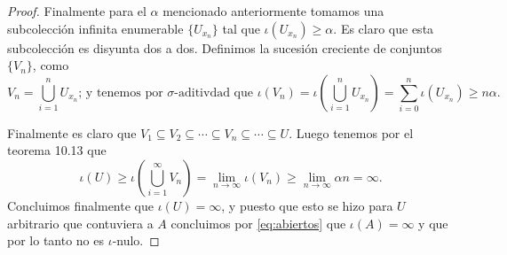 \documentclass[letter,twoside,12pt]{article}
\numberwithin{equation}{section}
\begin{document}
\begin{enumerate}[label = (\textbf{\arabic*.})]
\begin{enumerate}[label = (\textbf{\roman*.})]
\begin{proof}
Finalmente para el $\alpha$ mencionado anteriormente tomamos una subcolección infinita enumerable $\{U_{x_n}\}$ tal que $\iota(U_{x_n})\geq \alpha$. Es claro que esta subcolección es disyunta dos a dos. Definimos la sucesión creciente de conjuntos $\{V_n\}$, como 
$$V_n = \bigcup_{i=1}^n U_{x_n}\text{; y tenemos por $\sigma$-aditivdad que }\iota(V_n) = \iota(\bigcup_{i=1}^n U_{x_n}) = \sum_{i=0}^n \iota(U_{x_n}) \geq n\alpha.$$



Finalmente es claro que $V_1 \subseteq V_2 \subseteq \cdots \subseteq V_n \subseteq \cdots \subseteq U $. Luego tenemos por el teorema 10.13 \cite{hewitt} que
$$ \iota(U) \geq \iota(\bigcup_{i=1}^\infty V_n) = \lim_{n \to \infty} \iota(V_n) \geq \lim_{n \to \infty} \alpha n = \infty. $$ Concluimos finalmente que $\iota(U)= \infty $, y puesto que esto se hizo para $U$ arbitrario que contuviera a $A$ concluimos por \eqref{eq:abiertos} que $\iota(A)= \infty$ y que por lo tanto no es $\iota$-nulo.


\end{proof}
\end{enumerate}
\end{enumerate}
\end{document}
